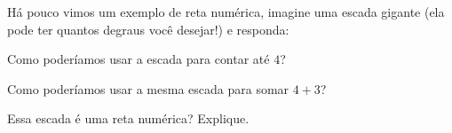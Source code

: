 \Question
Há pouco vimos um exemplo de reta numérica, imagine uma escada gigante (ela pode ter quantos degraus você desejar!) e responda:
\begin{Subquest}
	
	\item Como poderíamos usar a escada para contar até $ 4 $?
	\item Como poderíamos usar a mesma escada para somar $ 4+3 $?
	\item Essa escada é uma reta numérica? Explique.
	
\end{Subquest}






